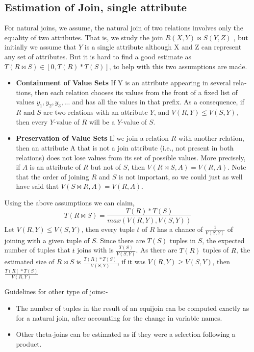 \subsection{Estimation of Join, single attribute}
For natural joins, we assume, the natural join of two relations involves only the equality of two attributes. That is, we study the
join $R(X, Y) \bowtie S(Y, Z)$ , but initially we assume that $Y$ is a single attribute although X and Z can represent any set of attributes. But it is hard to find a good estimate as $T(R\bowtie S) \in [0, T(R)*T(S)]$, to help with this two assumptions are made.
\begin{itemize}
    \item \textbf{Containment of Value Sets} If Y is an attribute appearing in several rela­tions, then each relation chooses its values from the front of a fixed list of values $y_1, y_2, y_3,...$ and has all the values in that prefix. As a consequence, if $R$ and $S$ are two relations with an attribute $Y$, and $V(R, Y) \leq V(S, Y)$, then every $Y$-value of $R$ will be a $Y$-value of $S$. 
    \item \textbf{Preservation of Value Sets} If we join a relation $R$ with another relation, then an attribute A that is not a join attribute (i.e., not present in both relations) does not lose values from its set of possible values. More precisely, if $A$ is an attribute of $R$ but not of $S$, then $V(R \bowtie S, A) = V(R, A)$. Note that the order of joining $R$ and $S$ is not important, so we could just as well have said that $V(S \bowtie R, A) = V (R, A)$.
\end{itemize}
\par Using the above assumptions we can claim, 
$$T(R\bowtie S)=\frac{T(R)*T(S)}{max(V(R,Y), V(S,Y))}$$
Let $V(R,Y) \leq V(S,Y)$, then every tuple $t$ of $R$ has a chance of $\frac{1}{V(S,Y)}$ of joining with a given tuple of $S$. Since there are $T(S)$ tuples in $S$, the expected number of tuples that $t$ joins with is $\frac{T(S)}{V(S, Y)}$. As there are
$T(R)$ tuples of $R$, the estimated size of $R \bowtie S$ is $\frac{T(R)*T(S)}{V(S,Y)}$, if it was $V(R,Y) \geq V(S,Y)$, then $\frac{T(R)*T(S)}{V(R,Y)}$
\par Guidelines for other type of joins:-
\begin{itemize}
    \item The number of tuples in the result of an equijoin can be computed exactly as for a natural join, after accounting for the change in variable names.
    \item Other theta-joins can be estimated as if they were a selection following a product.
\end{itemize}

